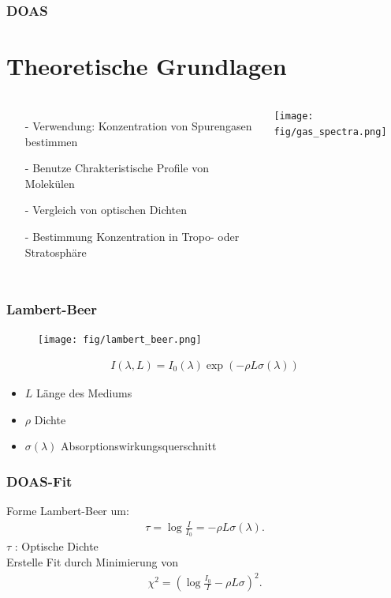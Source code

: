 \documentclass{beamer}
\begin{document}
\begin{frame}
    \frametitle{DOAS}
    \section{Theoretische Grundlagen}
    \begin{columns}
    \begin{itemize}
        \item[-] Verwendung: Konzentration von Spurengasen bestimmen
        \item[-] Benutze Chrakteristische Profile von Molekülen
        \item[-] Vergleich von optischen Dichten
        \item[-] Bestimmung Konzentration in Tropo- oder Stratosphäre
    \end{itemize}
    \begin{minipage}{80mm}
        \texttt{[image: fig/gas\_spectra.png]}
    \end{minipage}
    \end{columns}
\end{frame}

\begin{frame}
    \frametitle{Lambert-Beer}
    \begin{figure}[h]
        \texttt{[image: fig/lambert\_beer.png]}
    \end{figure}
    \begin{align}
    I(\lambda, L) = I_0 (\lambda) \exp (- \rho  L \sigma (\lambda) )
    \end{align}
    \begin{itemize}
        \item $L$ Länge des Mediums
        \item $\rho$ Dichte
        \item $\sigma (\lambda)$ Absorptionswirkungsquerschnitt %
    \end{itemize}
\end{frame}


\begin{frame}
    \frametitle{DOAS-Fit}
    Forme Lambert-Beer um:
\begin{align}
    \tau = \log \frac{I}{I_0} = - \rho L \sigma (\lambda).
\end{align}
$\tau$ : Optische Dichte\\
Erstelle Fit durch Minimierung von
    \begin{align}
        \chi^2 = ( \log \frac{I_0}{I} - \rho L \sigma )^2. 
    \end{align}
\end{frame}
\end{document}
